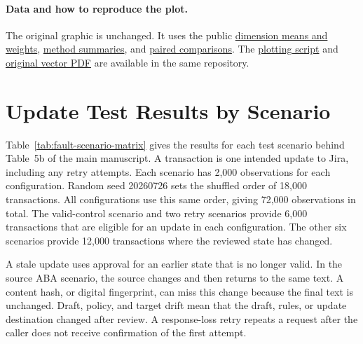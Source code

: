 \documentclass[10pt,a4paper]{article}
\begin{document}
\paragraph{Data and how to reproduce the plot.}
The original graphic is unchanged. It uses the public \href{https://github.com/anonymous94u/JiraEnhancer/blob/main/patent/reviewer_study/public_results/matched_review_quality_factor_comparison.csv}{dimension means and weights}, \href{https://github.com/anonymous94u/JiraEnhancer/blob/main/patent/reviewer_study/public_results/matched_review_method_summary.csv}{method summaries}, and \href{https://github.com/anonymous94u/JiraEnhancer/blob/main/patent/reviewer_study/public_results/matched_review_pairwise.csv}{paired comparisons}. The \href{https://github.com/anonymous94u/JiraEnhancer/blob/main/patent/reviewer_study/plot_weighted_review_radar.py}{plotting script} and \href{https://github.com/anonymous94u/JiraEnhancer/blob/main/patent/reviewer_study/public_results/matched_review_weighted_radar.pdf}{original vector PDF} are available in the same repository.

\FloatBarrier
\clearpage
\section{Update Test Results by Scenario}\label{sec:fault-scenario-matrix}
Table~\ref{tab:fault-scenario-matrix} gives the results for each test scenario behind Table~5b of the main manuscript. A transaction is one intended update to Jira, including any retry attempts. Each scenario has 2,000 observations for each configuration. Random seed 20260726 sets the shuffled order of 18,000 transactions. All configurations use this same order, giving 72,000 observations in total. The valid-control scenario and two retry scenarios provide 6,000 transactions that are eligible for an update in each configuration. The other six scenarios provide 12,000 transactions where the reviewed state has changed.

A stale update uses approval for an earlier state that is no longer valid. In the source ABA scenario, the source changes and then returns to the same text. A content hash, or digital fingerprint, can miss this change because the final text is unchanged. Draft, policy, and target drift mean that the draft, rules, or update destination changed after review. A response-loss retry repeats a request after the caller does not receive confirmation of the first attempt.
\end{document}
